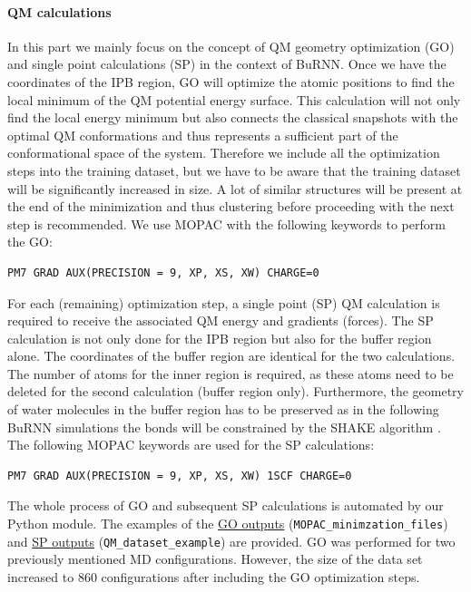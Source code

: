 \paragraph{QM calculations}
In this part we mainly focus on the concept of QM geometry optimization (GO) and single point calculations (SP) in the context of BuRNN. Once we have the coordinates of the IPB region, GO will optimize the atomic positions to find the local minimum of the QM potential energy surface. This calculation will not only find the local energy minimum but also connects the classical snapshots with the optimal QM conformations and thus represents a sufficient part of the conformational space of the system. Therefore we include all the optimization steps into the training dataset, but we have to be aware that the training dataset will be significantly increased in size. A lot of similar structures will be present at the end of the minimization and thus clustering before proceeding with the next step is recommended. We use MOPAC with the following keywords to perform the GO:

\begin{lstlisting}[breaklines=true, breakatwhitespace=false]
PM7 GRAD AUX(PRECISION = 9, XP, XS, XW) CHARGE=0
\end{lstlisting}

For each (remaining) optimization step, a single point (SP) QM calculation is required to receive the associated QM energy and gradients (forces). The SP calculation is not only done for the IPB region but also for the buffer region alone. The coordinates of the buffer region are identical for the two calculations. The number of atoms for the inner region is required, as these atoms need to be deleted for the second calculation (buffer region only). Furthermore, the geometry of water molecules in the buffer region has to be preserved as in the following BuRNN simulations the bonds will be constrained by the SHAKE algorithm \cite{RYCKAERT1977SHAKE}. The following MOPAC keywords are used for the SP calculations:

\begin{lstlisting}[breaklines=true, breakatwhitespace=false]
PM7 GRAD AUX(PRECISION = 9, XP, XS, XW) 1SCF CHARGE=0
\end{lstlisting}


The whole process of GO and subsequent SP calculations is automated by our Python module. The examples of the \href{https://github.com/LierB/gromos_tutorial_livecoms/tree/burnn_tutorial_rc/tutorial_files/t_06/train_dataset_tutorial/MOPAC_minimzation_files}{GO outputs} (\texttt{MOPAC\_minimzation\_files}) and \href{https://github.com/LierB/gromos_tutorial_livecoms/tree/burnn_tutorial_rc/tutorial_files/t_06/train_dataset_tutorial/QM_dataset_example}{SP outputs} (\texttt{QM\_dataset\_example}) are provided. GO was performed for two previously mentioned MD configurations. However, the size of the data set increased to 860 configurations after including the GO optimization steps.



